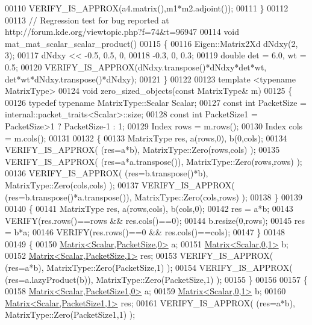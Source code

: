 \begin{DoxyCode}
00110   VERIFY\_IS\_APPROX(a4.matrix(),m1*m2.adjoint());
00111 \}
00112 
00113 \textcolor{comment}{// Regression test for bug reported at http://forum.kde.org/viewtopic.php?f=74&t=96947}
00114 \textcolor{keywordtype}{void} mat\_mat\_scalar\_scalar\_product()
00115 \{
00116   Eigen::Matrix2Xd dNdxy(2, 3);
00117   dNdxy << -0.5, 0.5, 0,
00118            -0.3, 0, 0.3;
00119   \textcolor{keywordtype}{double} det = 6.0, wt = 0.5;
00120   VERIFY\_IS\_APPROX(dNdxy.transpose()*dNdxy*det*wt, det*wt*dNdxy.transpose()*dNdxy);
00121 \}
00122 
00123 \textcolor{keyword}{template} <\textcolor{keyword}{typename} MatrixType> 
00124 \textcolor{keywordtype}{void} zero\_sized\_objects(\textcolor{keyword}{const} MatrixType& m)
00125 \{
00126   \textcolor{keyword}{typedef} \textcolor{keyword}{typename} MatrixType::Scalar Scalar;
00127   \textcolor{keyword}{const} \textcolor{keywordtype}{int} PacketSize  = internal::packet\_traits<Scalar>::size;
00128   \textcolor{keyword}{const} \textcolor{keywordtype}{int} PacketSize1 = PacketSize>1 ?  PacketSize-1 : 1;
00129   Index rows = m.rows();
00130   Index cols = m.cols();
00131   
00132   \{
00133     MatrixType res, a(rows,0), b(0,cols);
00134     VERIFY\_IS\_APPROX( (res=a*b), MatrixType::Zero(rows,cols) );
00135     VERIFY\_IS\_APPROX( (res=a*a.transpose()), MatrixType::Zero(rows,rows) );
00136     VERIFY\_IS\_APPROX( (res=b.transpose()*b), MatrixType::Zero(cols,cols) );
00137     VERIFY\_IS\_APPROX( (res=b.transpose()*a.transpose()), MatrixType::Zero(cols,rows) );
00138   \}
00139   
00140   \{
00141     MatrixType res, a(rows,cols), b(cols,0);
00142     res = a*b;
00143     VERIFY(res.rows()==rows && res.cols()==0);
00144     b.resize(0,rows);
00145     res = b*a;
00146     VERIFY(res.rows()==0 && res.cols()==cols);
00147   \}
00148   
00149   \{
00150     \hyperlink{group___core___module_class_eigen_1_1_matrix}{Matrix<Scalar,PacketSize,0>} a;
00151     \hyperlink{group___core___module_class_eigen_1_1_matrix}{Matrix<Scalar,0,1>} b;
00152     \hyperlink{group___core___module_class_eigen_1_1_matrix}{Matrix<Scalar,PacketSize,1>} res;
00153     VERIFY\_IS\_APPROX( (res=a*b), MatrixType::Zero(PacketSize,1) );
00154     VERIFY\_IS\_APPROX( (res=a.lazyProduct(b)), MatrixType::Zero(PacketSize,1) );
00155   \}
00156   
00157   \{
00158     \hyperlink{group___core___module_class_eigen_1_1_matrix}{Matrix<Scalar,PacketSize1,0>} a;
00159     \hyperlink{group___core___module_class_eigen_1_1_matrix}{Matrix<Scalar,0,1>} b;
00160     \hyperlink{group___core___module_class_eigen_1_1_matrix}{Matrix<Scalar,PacketSize1,1>} res;
00161     VERIFY\_IS\_APPROX( (res=a*b), MatrixType::Zero(PacketSize1,1) );

\end{DoxyCode}
